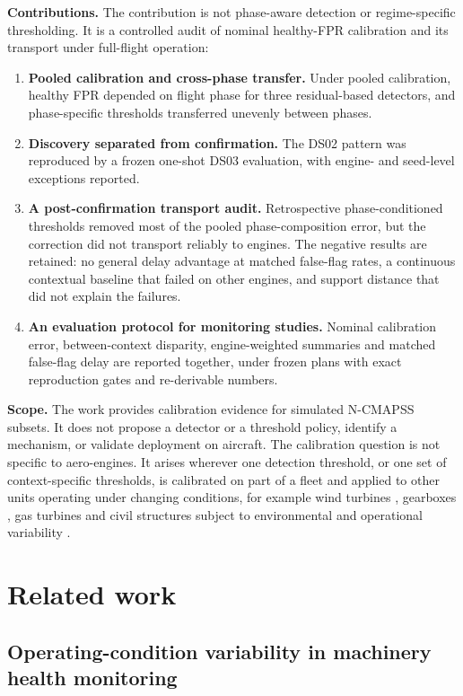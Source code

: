 \documentclass[preprint,11pt,a4paper]{elsarticle}
\begin{document}
\textbf{Contributions.} The contribution is not phase-aware detection or regime-specific thresholding. It is a controlled audit of nominal healthy-FPR calibration and its transport under full-flight operation:
\begin{enumerate}
\item \textbf{Pooled calibration and cross-phase transfer.} Under pooled calibration, healthy FPR depended on flight phase for three residual-based detectors, and phase-specific thresholds transferred unevenly between phases.
\item \textbf{Discovery separated from confirmation.} The DS02 pattern was reproduced by a frozen one-shot DS03 evaluation, with engine- and seed-level exceptions reported.
\item \textbf{A post-confirmation transport audit.} Retrospective phase-conditioned thresholds removed most of the pooled phase-composition error, but the correction did not transport reliably to engines. The negative results are retained: no general delay advantage at matched false-flag rates, a continuous contextual baseline that failed on other engines, and support distance that did not explain the failures.
\item \textbf{An evaluation protocol for monitoring studies.} Nominal calibration error, between-context disparity, engine-weighted summaries and matched false-flag delay are reported together, under frozen plans with exact reproduction gates and re-derivable numbers.
\end{enumerate}

\textbf{Scope.} The work provides calibration evidence for simulated N-CMAPSS subsets. It does not propose a detector or a threshold policy, identify a mechanism, or validate deployment on aircraft. The calibration question is not specific to aero-engines. It arises wherever one detection threshold, or one set of context-specific thresholds, is calibrated on part of a fleet and applied to other units operating under changing conditions, for example wind turbines \cite{N1,N4}, gearboxes \cite{N3}, gas turbines \cite{N13} and civil structures subject to environmental and operational variability \cite{N2,N5,N6}.

\section{Related work}

\subsection{Operating-condition variability in machinery health monitoring}
\end{document}
